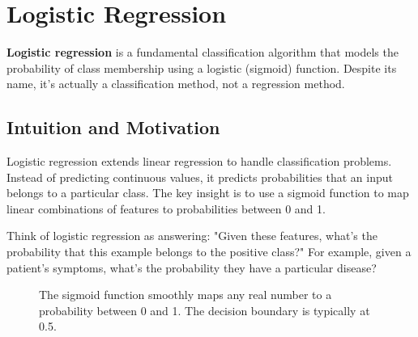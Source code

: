 
\section{Logistic Regression}
\label{sec:logistic-regression}

\textbf{Logistic regression} is a fundamental classification algorithm that models the probability of class membership using a logistic (sigmoid) function. Despite its name, it's actually a classification method, not a regression method.

\subsection{Intuition and Motivation}

Logistic regression extends linear regression to handle classification problems. Instead of predicting continuous values, it predicts probabilities that an input belongs to a particular class. The key insight is to use a sigmoid function to map linear combinations of features to probabilities between 0 and 1.

Think of logistic regression as answering: "Given these features, what's the probability that this example belongs to the positive class?" For example, given a patient's symptoms, what's the probability they have a particular disease?

\begin{figure}[htbp]
\centering
{}
\caption{The sigmoid function smoothly maps any real number to a probability between 0 and 1. The decision boundary is typically at 0.5.}
\label{fig:sigmoid-function}
\end{figure}

